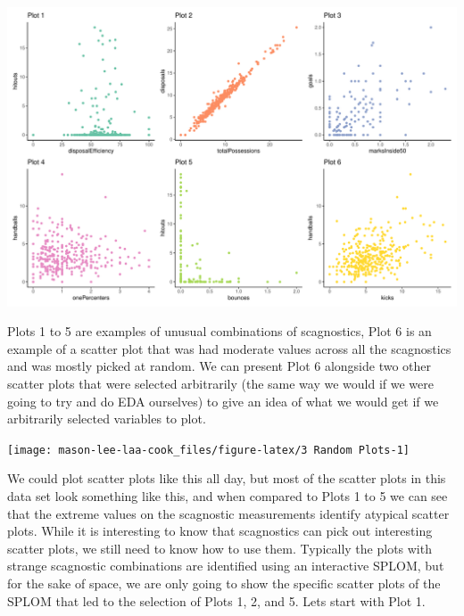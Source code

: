 \begin{Schunk}


\begin{center}\includegraphics[width=0.8\linewidth]{mason-lee-laa-cook_files/figure-latex/AFLW-scatters-static-1} \end{center}

\end{Schunk}

Plots 1 to 5 are examples of unusual combinations of scagnostics, Plot 6
is an example of a scatter plot that was had moderate values across all
the scagnostics and was mostly picked at random. We can present Plot 6
alongside two other scatter plots that were selected arbitrarily (the
same way we would if we were going to try and do EDA ourselves) to give
an idea of what we would get if we arbitrarily selected variables to
plot.

\begin{Schunk}


\begin{center}\texttt{[image: mason-lee-laa-cook\_files/figure-latex/3 Random Plots-1]} \end{center}

\end{Schunk}

We could plot scatter plots like this all day, but most of the scatter
plots in this data set look something like this, and when compared to
Plots 1 to 5 we can see that the extreme values on the scagnostic
measurements identify atypical scatter plots. While it is interesting to
know that scagnostics can pick out interesting scatter plots, we still
need to know how to use them. Typically the plots with strange
scagnostic combinations are identified using an interactive SPLOM, but
for the sake of space, we are only going to show the specific scatter
plots of the SPLOM that led to the selection of Plots 1, 2, and 5. Lets
start with Plot 1.

